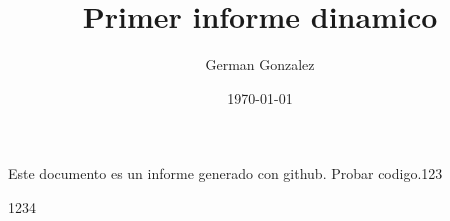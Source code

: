 \documentclass[12pt,a4paper]{book}
\title{Primer informe dinamico}
\author{German Gonzalez}
\date{\today}
\begin{document}
\maketitle

Este documento es un informe generado con github.
Probar codigo.123

1234
\end{document}
